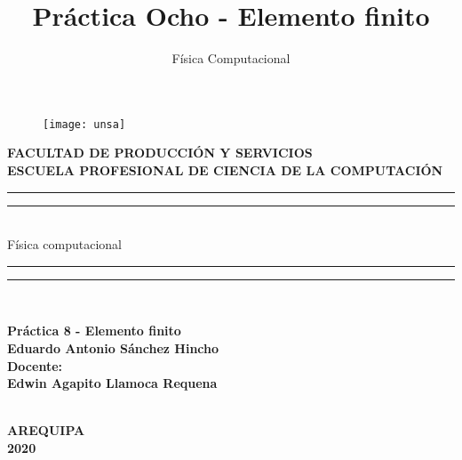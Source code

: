 \documentclass[10pt,a4paper]{article}
\title{Pr\'actica Ocho - Elemento finito}
\author{F\'isica Computacional}
\date{}
\begin{document}
\thispagestyle{empty}

\vfill
 \begin{center}
    \begin{figure}[h]
    \centering
    \texttt{[image: unsa]}\\
    
    \end{figure}
 	 
     \vspace*{1.5cm}
    {\large\bfseries FACULTAD DE PRODUCCIÓN Y SERVICIOS} \\
    {\large\bfseries ESCUELA PROFESIONAL DE CIENCIA DE LA COMPUTACIÓN}  \\    
    \vspace*{1.5cm}
    
 	\rule[0.5ex]{\linewidth}{2pt}\vspace*{-\baselineskip}\vspace*		{3.2pt}
	\rule[0.5ex]{\linewidth}{1pt}\\[\baselineskip]
 	{\huge Física computacional} \\[4mm]
    \rule[0.5ex]{\linewidth}{1pt}\vspace*{-							\baselineskip}\vspace{3.2pt}
	\rule[0.5ex]{\linewidth}{2pt}\\
 	\vspace*{1cm}

    \begin{large} \bfseries
    Práctica 8 - Elemento finito \\
    
    \vspace{5mm}
    Eduardo Antonio Sánchez Hincho \\

    \vspace{5mm}
    Docente:\\
    Edwin Agapito Llamoca Requena
    \end{large}
    \vspace*{0.4in}
    
    \noindent \\
    
    \vfill
    \large\bfseries{ AREQUIPA\\2020}
\end{center}
\newpage


\maketitle
\end{document}
